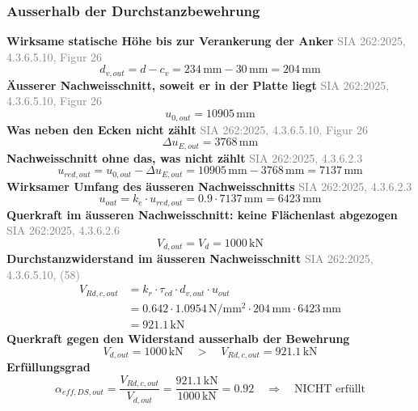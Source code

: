 \documentclass[11pt,a4paper]{article}
\newcommand{\normref}[1]{{\small\textcolor{gray}{#1}}}
\begin{document}
\subsubsection{Ausserhalb der Durchstanzbewehrung}
\noindent\textbf{Wirksame statische Höhe bis zur Verankerung der Anker} \hfill \normref{SIA 262:2025, 4.3.6.5.10, Figur 26}
\begin{equation*}
d_{v,out} = d - c_v = 234\,\mathrm{mm} - 30\,\mathrm{mm} = 204\,\mathrm{mm}
\end{equation*}
\noindent\textbf{Äusserer Nachweisschnitt, soweit er in der Platte liegt} \hfill \normref{SIA 262:2025, 4.3.6.5.10, Figur 26}
\begin{equation*}
u_{0,out} = 10905\,\mathrm{mm}
\end{equation*}
\noindent\textbf{Was neben den Ecken nicht zählt} \hfill \normref{SIA 262:2025, 4.3.6.5.10, Figur 26}
\begin{equation*}
\Delta u_{E,out} = 3768\,\mathrm{mm}
\end{equation*}
\noindent\textbf{Nachweisschnitt ohne das, was nicht zählt} \hfill \normref{SIA 262:2025, 4.3.6.2.3}
\begin{equation*}
u_{red,out} = u_{0,out} - \Delta u_{E,out} = 10905\,\mathrm{mm} - 3768\,\mathrm{mm} = 7137\,\mathrm{mm}
\end{equation*}
\noindent\textbf{Wirksamer Umfang des äusseren Nachweisschnitts} \hfill \normref{SIA 262:2025, 4.3.6.2.3}
\begin{equation*}
u_{out} = k_e \cdot u_{red,out} = 0.9 \cdot 7137\,\mathrm{mm} = 6423\,\mathrm{mm}
\end{equation*}
\noindent\textbf{Querkraft im äusseren Nachweisschnitt: keine Flächenlast abgezogen} \hfill \normref{SIA 262:2025, 4.3.6.2.6}
\begin{equation*}
V_{d,out} = V_d = 1000\,\mathrm{kN}
\end{equation*}
\noindent\textbf{Durchstanzwiderstand im äusseren Nachweisschnitt} \hfill \normref{SIA 262:2025, 4.3.6.5.10, (58)}
\begin{equation*}
\begin{aligned}
  V_{Rd,c,out} &= k_r \cdot \tau_{cd} \cdot d_{v,out} \cdot u_{out} \\
  &= 0.642 \cdot 1.0954\,\mathrm{N}/\mathrm{mm}^{2} \cdot 204\,\mathrm{mm} \cdot 6423\,\mathrm{mm} \\
  &= 921.1\,\mathrm{kN}
\end{aligned}
\end{equation*}
\noindent\textbf{Querkraft gegen den Widerstand ausserhalb der Bewehrung}
\begin{equation*}
V_{d,out} = 1000\,\mathrm{kN} \quad > \quad V_{Rd,c,out} = 921.1\,\mathrm{kN}
\end{equation*}
\noindent\textbf{Erfüllungsgrad}
\begin{equation*}
\alpha_{eff,DS,out} = \frac{V_{Rd,c,out}}{V_{d,out}} = \frac{921.1\,\mathrm{kN}}{1000\,\mathrm{kN}} = 0.92 \quad \Rightarrow \quad \text{NICHT erfüllt}
\end{equation*}
\end{document}
